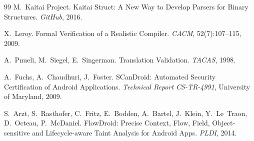 \documentclass[runningheads]{llncs}
\begin{document}
\begin{thebibliography}{99}
M.~Kaitai Project.
\newblock Kaitai Struct: A New Way to Develop Parsers for Binary Structures.
\newblock \emph{GitHub}, 2016.

X.~Leroy.
\newblock Formal Verification of a Realistic Compiler.
\newblock \emph{CACM}, 52(7):107--115, 2009.

A.~Pnueli, M.~Siegel, E.~Singerman.
\newblock Translation Validation.
\newblock \emph{TACAS}, 1998.

A.~Fuchs, A.~Chaudhuri, J.~Foster.
\newblock SCanDroid: Automated Security Certification of Android Applications.
\newblock \emph{Technical Report CS-TR-4991}, University of Maryland, 2009.

S.~Arzt, S.~Rasthofer, C.~Fritz, E.~Bodden, A.~Bartel, J.~Klein,
Y.~Le~Traon, D.~Octeau, P.~McDaniel.
\newblock FlowDroid: Precise Context, Flow, Field, Object-sensitive and
  Lifecycle-aware Taint Analysis for Android Apps.
\newblock \emph{PLDI}, 2014.

\end{thebibliography}
\end{document}

